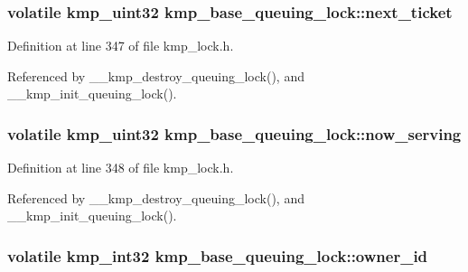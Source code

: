\hypertarget{structkmp__base__queuing__lock_a3fe180e67160e4ffc68fe94cd502e517}{
\subsubsection[{next\-\_\-ticket}]{\setlength{\rightskip}{0pt plus 5cm}volatile kmp\-\_\-uint32 kmp\-\_\-base\-\_\-queuing\-\_\-lock\-::next\-\_\-ticket}}\label{structkmp__base__queuing__lock_a3fe180e67160e4ffc68fe94cd502e517}


Definition at line 347 of file kmp\-\_\-lock.\-h.



Referenced by \-\_\-\-\_\-kmp\-\_\-destroy\-\_\-queuing\-\_\-lock(), and \-\_\-\-\_\-kmp\-\_\-init\-\_\-queuing\-\_\-lock().

\hypertarget{structkmp__base__queuing__lock_aefbcb3d6e899551ed7ae3f2f7dfb4406}{
\subsubsection[{now\-\_\-serving}]{\setlength{\rightskip}{0pt plus 5cm}volatile kmp\-\_\-uint32 kmp\-\_\-base\-\_\-queuing\-\_\-lock\-::now\-\_\-serving}}\label{structkmp__base__queuing__lock_aefbcb3d6e899551ed7ae3f2f7dfb4406}


Definition at line 348 of file kmp\-\_\-lock.\-h.



Referenced by \-\_\-\-\_\-kmp\-\_\-destroy\-\_\-queuing\-\_\-lock(), and \-\_\-\-\_\-kmp\-\_\-init\-\_\-queuing\-\_\-lock().

\hypertarget{structkmp__base__queuing__lock_a26c7922624855130950f47f0d41c5b78}{
\subsubsection[{owner\-\_\-id}]{\setlength{\rightskip}{0pt plus 5cm}volatile kmp\-\_\-int32 kmp\-\_\-base\-\_\-queuing\-\_\-lock\-::owner\-\_\-id}}\label{structkmp__base__queuing__lock_a26c7922624855130950f47f0d41c5b78}


